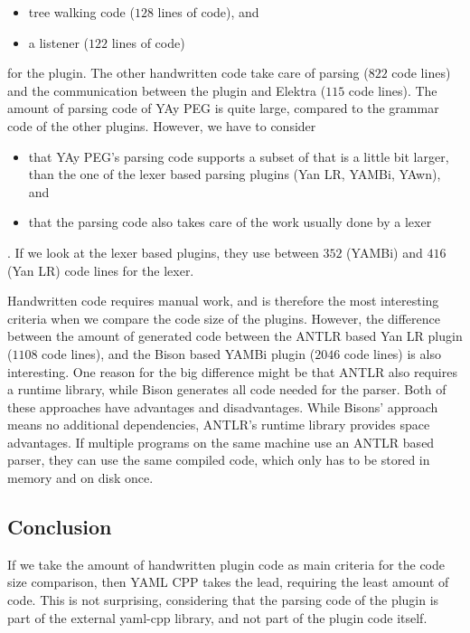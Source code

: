 \begin{itemize}
  \item tree walking code ($128$ lines of code), and
  \item a listener ($122$ lines of code)
\end{itemize}

for the plugin. The other handwritten code take care of parsing ($822$ code lines) and the communication between the plugin and Elektra ($115$ code lines). The amount of parsing code of YAy PEG is quite large, compared to the grammar code of the other plugins. However, we have to consider

\begin{itemize}
  \item that YAy PEG’s parsing code supports a subset of  that is a little bit larger, than the one of the lexer based parsing plugins (Yan LR, YAMBi, YAwn), and
  \item that the parsing code also takes care of the work usually done by a lexer
\end{itemize}

. If we look at the lexer based plugins, they use between $352$ (YAMBi) and $416$ (Yan LR) code lines for the lexer.

Handwritten code requires manual work, and is therefore the most interesting criteria when we compare the code size of the plugins. However, the difference between the amount of generated code between the ANTLR based Yan LR plugin ($1108$ code lines), and the Bison based YAMBi plugin ($2046$ code lines) is also interesting. One reason for the big difference might be that ANTLR also requires a runtime library, while Bison generates all code needed for the parser. Both of these approaches have advantages and disadvantages. While Bisons’ approach means no additional dependencies, ANTLR’s runtime library provides space advantages. If multiple programs on the same machine use an ANTLR based parser, they can use the same compiled code, which only has to be stored in memory and on disk once.

\subsection{Conclusion}

If we take the amount of handwritten plugin code as main criteria for the code size comparison, then YAML CPP takes the lead, requiring the least amount of code. This is not surprising, considering that the parsing code of the plugin is part of the external yaml-cpp library, and not part of the plugin code itself.

